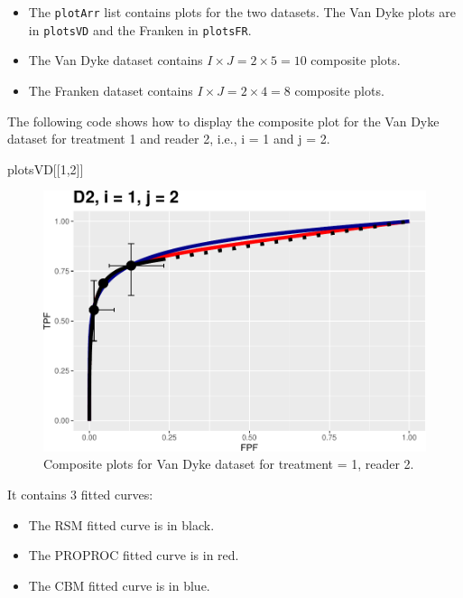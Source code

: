 \documentclass[
]{book}
\newenvironment{Shaded}{\begin{snugshade}}{\end{snugshade}}
\newcommand{\DecValTok}[1]{\textcolor[rgb]{0.00,0.00,0.81}{#1}}
\newcommand{\NormalTok}[1]{#1}
\providecommand{\tightlist}{%
  \setlength{\itemsep}{0pt}\setlength{\parskip}{0pt}}
\begin{document}
\begin{itemize}
\tightlist
\item
  The \texttt{plotArr} list contains plots for the two datasets. The Van Dyke plots are in \texttt{plotsVD} and the Franken in \texttt{plotsFR}.
\item
  The Van Dyke dataset contains \(I \times J = 2 \times 5 = 10\) composite plots.
\item
  The Franken dataset contains \(I \times J = 2 \times 4 = 8\) composite plots.
\end{itemize}

The following code shows how to display the composite plot for the Van Dyke dataset for treatment 1 and reader 2, i.e., i = 1 and j = 2.

\begin{Shaded}
\begin{Highlighting}[]
\NormalTok{plotsVD[[}\DecValTok{1}\NormalTok{,}\DecValTok{2}\NormalTok{]]}
\end{Highlighting}
\end{Shaded}

\begin{figure}
\centering
\includegraphics{12-rsm-3-fits_files/figure-latex/rsm-3-fits-plots-vd-12-1.pdf}
\caption{\label{fig:rsm-3-fits-plots-vd-12}Composite plots for Van Dyke dataset for treatment = 1, reader 2.}
\end{figure}

It contains 3 fitted curves:

\begin{itemize}
\tightlist
\item
  The RSM fitted curve is in black.
\item
  The PROPROC fitted curve is in red.
\item
  The CBM fitted curve is in blue.
\end{itemize}
\end{document}
